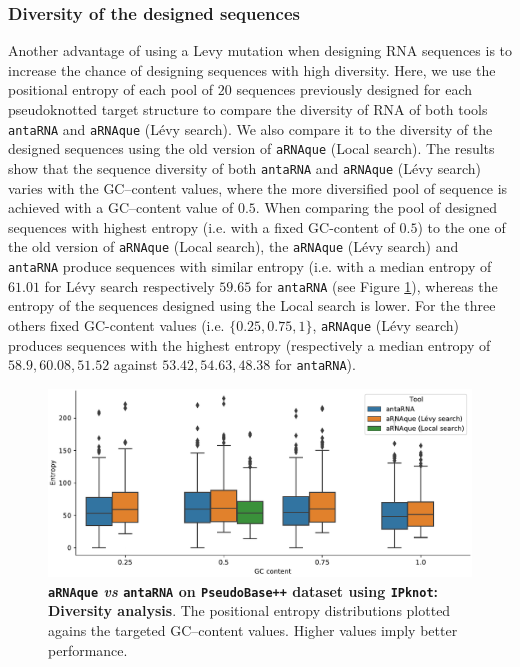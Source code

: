 \subsubsection{Diversity of the designed sequences}
Another advantage of using a Levy mutation when designing RNA sequences is to increase the chance of designing sequences with high diversity. Here, we use the positional entropy of each pool of $20$ sequences previously designed for each pseudoknotted target structure to compare the diversity of RNA of both tools \texttt{antaRNA} and \texttt{aRNAque} (Lévy search). We also compare it to the diversity of the designed sequences using the old version of \texttt{aRNAque} (Local search). The results show that the sequence diversity of both \texttt{antaRNA} and \texttt{aRNAque} (Lévy search) varies with the GC--content values, where the more diversified pool of sequence is achieved with a GC--content value of $0.5$. When comparing the pool of designed sequences with highest entropy (i.e. with a fixed GC-content of $0.5$) to the one of the old version of \texttt{aRNAque} (Local search), the \texttt{aRNAque} (Lévy search) and \texttt{antaRNA} produce sequences with similar entropy (i.e. with a median entropy of $61.01$ for Lévy search respectively $59.65$ for \texttt{antaRNA} (see Figure \ref{Fig:result_diversity}), whereas the entropy of the sequences designed using the Local search is lower. For the three others fixed GC-content values (i.e. $\{0.25, 0.75, 1 \}$, \texttt{aRNAque} (Lévy search) produces sequences with the highest entropy (respectively a median entropy of $58.9, 60.08, 51.52$ against  $53.42, 54.63, 48.38$ for \texttt{antaRNA}).
\begin{figure}[ht]
	\includegraphics[width=1.0\linewidth]{../res/images/arnaque/fig7.pdf}
	\caption{\textbf{\texttt{aRNAque} \emph{vs} \texttt{antaRNA} on \texttt{PseudoBase++} dataset using \texttt{IPknot}: Diversity analysis}. The positional entropy distributions plotted agains the targeted GC--content values.  Higher values imply better performance.}\label{Fig:result_diversity}
\end{figure}



